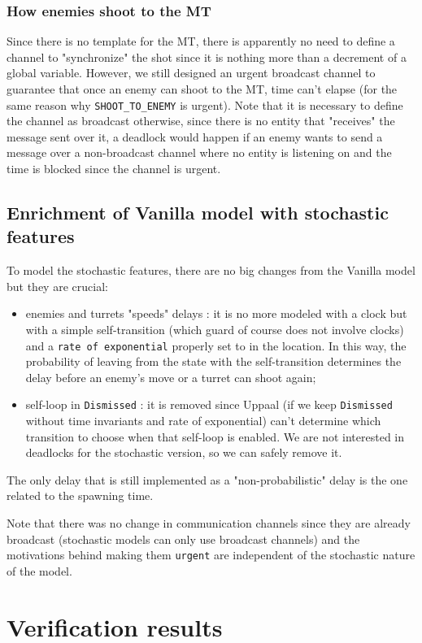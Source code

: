 \documentclass[
10pt, %
a4paper, %
oneside, %
headinclude,footinclude, %
BCOR5mm, %
]{scrartcl}
\begin{document}
			\subsubsection{How enemies shoot to the MT}
				Since there is no template for the MT, there is apparently no need to define a channel to "synchronize" the shot since it is nothing more than a decrement of a global variable. However, we still designed an urgent broadcast channel to guarantee that once an enemy can shoot to the MT, time can't elapse (for the same reason why \texttt{SHOOT\_TO\_ENEMY} is urgent). Note that it is necessary to define the channel as broadcast otherwise, since there is no entity that "receives" the message sent over it, a deadlock would happen if an enemy wants to send a message over a non-broadcast channel where no entity is listening on and the time is blocked since the channel is urgent.
		\subsection{Enrichment of Vanilla model with stochastic features}
			To model the stochastic features, there are no big changes from the Vanilla model but they are crucial:
			\begin{itemize}
				\item enemies and turrets "speeds" delays : it is no more modeled with a clock but with a simple self-transition (which guard of course does not involve clocks) and a \texttt{rate of exponential} properly set to in the location. In this way, the probability of leaving from the state with the self-transition determines the delay before an enemy's move or a turret can shoot again;
				\item self-loop in \texttt{Dismissed} : it is removed since Uppaal (if we keep \texttt{Dismissed} without time invariants and rate of exponential) can't determine which transition to choose when that self-loop is enabled. We are not interested in deadlocks for the stochastic version, so we can safely remove it.
			\end{itemize}
			The only delay that is still implemented as a "non-probabilistic" delay is the one related to the spawning time.
			
			Note that there was no change in communication channels since they are already broadcast (stochastic models can only use broadcast channels) and the motivations behind making them \texttt{urgent} are independent of the stochastic nature of the model.
	\section{Verification results}
\end{document}
